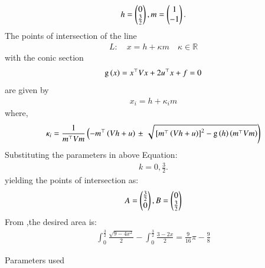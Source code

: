 \documentclass[journal]{IEEEtran}
\begin{document}
\begin{align}
    h=\begin{pmatrix}0\\ \frac{3}{2}\end{pmatrix},m=\begin{pmatrix}1\\-1\end{pmatrix}.
\end{align}
The points of intersection of the line 
\begin{align}
L: \quad x = h + \kappa m \quad \kappa \in \mathbb{R}
\label{eq:conic_tangent}
\end{align}
with the conic section \begin{align}
	\text{g}\left(x\right) = x^{\top}Vx+2u^{\top}x+f=0
    \end{align} are given by
\begin{align}
x_i = h + \kappa_im
	\label{eq:chord-pts}
\end{align}
where,
    \begin{multline}
\kappa_i = \frac{1}
{
m^{\top}Vm
}
\left(-m^{\top}\left(Vh+u\right)\right.
\pm
\left.\sqrt{
{}\left[
m^{\top}\left(Vh+u\right)
\right]^2
	-\text{g}
\left(h
\right)
\left(m^{\top}Vm\right)
}
\right)
\label{eq:app-tangent_roots}
\end{multline}
Substituting the parameters in above Equation:\\
\begin{align}
    k=0,\frac{3}{2}.
\end{align}
yielding the points of intersection as:\\
\begin{align}
    A=\begin{pmatrix}\frac{3}{2}\\0\end{pmatrix},B=\begin{pmatrix}0\\ \frac{3}{2}\end{pmatrix}
\end{align}
From ,the desired area is:\\
\begin{align}
\int_{0}^{\frac{3}{2}}\frac{\sqrt{9-4x^2}}{2}-\int_{0}^{\frac{3}{2}}\frac{3-2x}{2}=\frac{9}{16}\pi-\frac{9}{8}
\end{align}
\begin{table}[h]
    \centering
    
    \caption{Parameters used}
    \label{}
\end{table}
\end{document}

